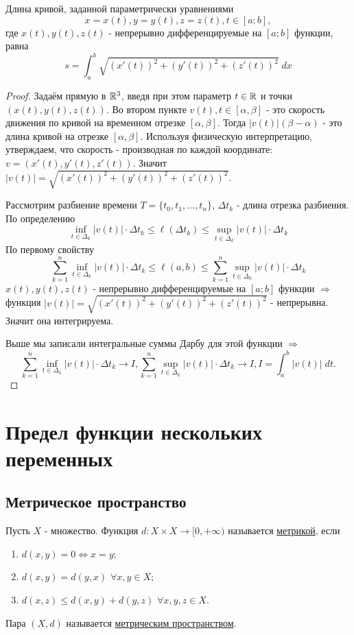    \begin{theorem}
    	Длина кривой, заданной параметрически уравнениями
    	\[ x = x(t), y = y(t), z = z(t), t \in [a; b], \]
    	где $x(t), y(t), z(t)$ - непрерывно дифференцируемые на $[a; b]$ функции, равна
    	\[ s = \int_a^b \sqrt{(x'(t))^2 + (y'(t))^2 + (z'(t))^2} \; dx \]
    \end{theorem}
    
    \begin{proof}
    	Задаём прямую в $\mathbb R^3$, введя при этом параметр $t \in \mathbb R$ и точки $(x(t), y(t), z(t))$. Во втором пункте $v(t), t \in [\alpha, \beta]$ - это скорость движения по кривой на временном отрезке $[\alpha, \beta]$. Тогда $|v(t)|(\beta - \alpha)$ - это длина кривой на отрезке $[\alpha, \beta]$. Используя физическую интерпретацию, утверждаем, что скорость - производная по каждой координате: $v = (x'(t), y'(t), z'(t))$. Значит $|v(t)| = \sqrt{(x'(t))^2 + (y'(t))^2 + (z'(t))^2}$.
    	
        Рассмотрим разбиение времени $T = \{t_0, t_1, ..., t_n\}$, $\Delta t_k$ - длина отрезка разбиения. По определению
        \[ \inf_{t \in \Delta_k} |v(t)| \cdot \Delta t_k \leqslant \ell(\Delta t_k) \leqslant \sup_{t \in \Delta_k} |v(t)| \cdot \Delta t_k \]
        По первому свойству
        \[ \sum_{k = 1}^n \inf_{t \in \Delta_k} |v(t)| \cdot \Delta t_k \leqslant \ell(a, b) \leqslant \sum_{k = 1}^n \sup_{t \in \Delta_k} |v(t)| \cdot \Delta t_k \]
        $x(t), y(t), z(t)$ - непрерывно дифференцируемые на $[a; b]$ функции $\Rightarrow$ функция $|v(t)| = \sqrt{(x'(t))^2 + (y'(t))^2 + (z'(t))^2}$ - непрерывна. Значит она интегрируема.
        
        Выше мы записали интегральные суммы Дарбу для этой функции $\Rightarrow$
        \[ \sum_{k = 1}^n \inf_{t \in \Delta_k} |v(t)| \cdot \Delta t_k \to I, \sum_{k = 1}^n \sup_{t \in \Delta_k} |v(t)| \cdot \Delta t_k \to I, I = \int_a^b |v(t)| \; dt. \]
    \end{proof}
    
    \chapter{Предел функции нескольких переменных}
    
    \section{Метрическое пространство}
    
    \begin{definition}
    	Пусть $X$ - множество. Функция $d: X \times X \rightarrow [0, +\infty)$ называется \underline{метрикой}, если
    	\begin{enumerate}
    		\item $d(x, y) = 0 \Leftrightarrow x = y;$
    		\item $d(x, y) = d(y, x)$ $\forall x, y \in X;$
    		\item $d(x, z) \leqslant d(x, y) + d(y, z)$ $\forall x, y, z \in X.$
    	\end{enumerate}
    	Пара $(X, d)$ называется \underline{метрическим пространством}.
    \end{definition}
    
